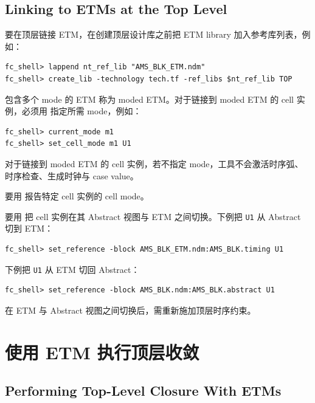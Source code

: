 \subsection*{Linking to ETMs at the Top Level}

要在顶层链接 ETM，在创建顶层设计库之前把 ETM library 加入参考库列表，例如：
\begin{lstlisting}
fc_shell> lappend nt_ref_lib "AMS_BLK_ETM.ndm"
fc_shell> create_lib -technology tech.tf -ref_libs $nt_ref_lib TOP
\end{lstlisting}

包含多个 mode 的 ETM 称为 moded ETM。对于链接到 moded ETM 的 cell 实例，必须用  指定所需 mode，例如：
\begin{lstlisting}
fc_shell> current_mode m1
fc_shell> set_cell_mode m1 U1
\end{lstlisting}

对于链接到 moded ETM 的 cell 实例，若不指定 mode，工具不会激活时序弧、时序检查、生成时钟与 case value。

要用  报告特定 cell 实例的 cell mode。

要用  把 cell 实例在其 Abstract 视图与 ETM 之间切换。下例把 \texttt{U1} 从 Abstract 切到 ETM：
\begin{lstlisting}
fc_shell> set_reference -block AMS_BLK_ETM.ndm:AMS_BLK.timing U1
\end{lstlisting}

下例把 \texttt{U1} 从 ETM 切回 Abstract：
\begin{lstlisting}
fc_shell> set_reference -block AMS_BLK.ndm:AMS_BLK.abstract U1
\end{lstlisting}

在 ETM 与 Abstract 视图之间切换后，需重新施加顶层时序约束。

\section{使用 ETM 执行顶层收敛}
\subsection*{Performing Top-Level Closure With ETMs}

